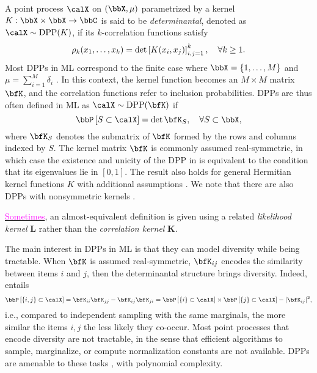 \documentclass[twoside,11pt]{article}
\begin{document}
        A point process $\calX$ on $(\bbX,\mu)$ parametrized by a kernel $K:\bbX\times \bbX\rightarrow \bbC$ is said to be \emph{determinantal}, denoted as $\calX\sim\DPP(K)$, if its $k$-correlation functions satisfy
        \begin{equation*}
            \label{eq:k-correlation_function_DPP}
            \rho_k(x_1,\dots,x_k)
              = \det \left[ K(x_i, x_j) \right]_{i,j=1}^k,
            \quad \forall k\geq 1.
        \end{equation*}
        Most DPPs in ML correspond to the finite case where $\bbX = \lrcb{1,\dots,M}$ and $\mu=\sum_{i=1}^M \delta_i$ \citep{KuTa12}.
        In this context, the kernel function becomes an $M\times M$ matrix $\bfK$, and the correlation functions refer to inclusion probabilities.
        DPPs are thus often defined in ML as $\calX\sim \DPP(\bfK)$ if
        \begin{equation}
        \label{eq:inclusion_proba_finite}
            \Proba{S \subset \calX} = \det {\bfK}_S,
                \quad\forall S\subset \bbX,
        \end{equation}
        where ${\bfK}_S$ denotes the submatrix of $\bfK$ formed by the rows and columns indexed by $S$.
        The kernel matrix $\bfK$ is commonly assumed real-symmetric, in which case the existence and unicity of the DPP in  is equivalent to the condition that its eigenvalues lie in $[0,1]$.
        The result also holds for general Hermitian kernel functions $K$ with additional assumptions \cite[Theorem 3]{Sos00}.
        We note that there are also DPPs with nonsymmetric kernels \citep{BoDiFu10}.

        \href{https://dppy.readthedocs.io/en/latest/finite_dpps/definition.html}{\textcolor{magenta}{Sometimes}}, an almost-equivalent definition is given using a related \emph{likelihood kernel} $\mathbf{L}$ rather than the \emph{correlation kernel} $\mathbf{K}$.

        The main interest in DPPs in ML is that they can model diversity while being tractable.
        When $\bfK$ is assumed real-symmetric, ${\bfK}_{ij}$ encodes the similarity between items $i$ and $j$, then the determinantal structure brings diversity.
        Indeed,  entails
        \begin{equation*}
        \label{eq:2point_correlation_function_inclusion_proba_finite_case}
          \Proba{\{i,j\} \subset \calX}
            = {\bfK}_{ii}{\bfK}_{jj}-{\bfK}_{ij}{\bfK}_{ji}
            = \Proba{\{i\} \subset \calX}
              \times \Proba{\{j\} \subset \calX}
                - |{\bfK}_{ij}|^2,
        \end{equation*}
        i.e., compared to independent sampling with the same marginals, the more similar the items $i, j$ the less likely they co-occur.
        Most point processes that encode diversity are not tractable, in the sense that efficient algorithms to sample, marginalize, or compute normalization constants are not available.
        DPPs are amenable to these tasks \citep{KuTa12,Gil14}, with polynomial complexity.
\end{document}
